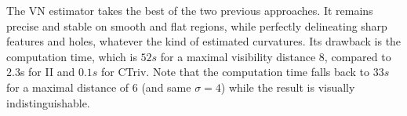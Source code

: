 The VN estimator takes the best of the two previous approaches. It
remains precise and stable on smooth and flat regions, while
perfectly delineating sharp features and holes, whatever the kind
of estimated curvatures. Its drawback is the computation time,
which is $52s$ for a maximal visibility distance $8$, compared to
$2.3$s for II and $0.1s$ for CTriv. Note that the computation time
falls back to $33s$ for a maximal distance of $6$ (and same
$\sigma=4$) while the result is visually indistinguishable.


\newcommand{\MyZoom}[1]{%
    \begin{tikzpicture}[spy using outlines={circle,magnification=1.8,size=2cm,connect spies}]
    \node[inner sep=0pt] {\pgfimage[width=0.3\textwidth]{#1}};
    \spy[overlay,blue] on (0.4,0.2) in node at (-0.8,0.8);
    \end{tikzpicture}}

